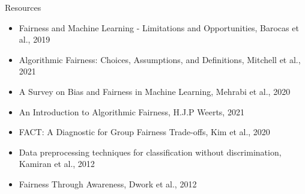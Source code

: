 \documentclass[11pt,compress,t,notes=noshow, xcolor=table]{beamer}
\begin{document}
\begin{vbframe}{Resources}
    \begin{itemize}
        \item Fairness and Machine Learning - Limitations and Opportunities, Barocas et al., 2019
        \item Algorithmic Fairness: Choices, Assumptions, and Definitions, Mitchell et al., 2021
        \item A Survey on Bias and Fairness in Machine Learning, Mehrabi et al., 2020
        \item An Introduction to Algorithmic Fairness, H.J.P Weerts, 2021
        \item FACT: A Diagnostic for Group Fairness Trade-offs, Kim et al., 2020
        \item Data preprocessing techniques for classification without discrimination, Kamiran et al., 2012
        \item Fairness Through Awareness, Dwork et al., 2012
    \end{itemize}
\end{vbframe}


\endlecture
\end{document}
